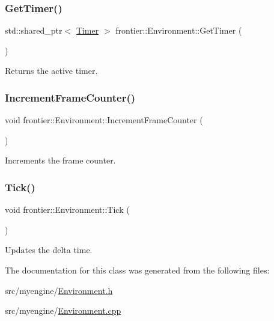 \subsubsection{\texorpdfstring{Get\+Timer()}{GetTimer()}}
{\footnotesize\ttfamily std\+::shared\+\_\+ptr$<$ \hyperlink{classfrontier_1_1_timer}{Timer} $>$ frontier\+::\+Environment\+::\+Get\+Timer (\begin{DoxyParamCaption}{ }\end{DoxyParamCaption})}



Returns the active timer. 

\mbox{\label{classfrontier_1_1_environment_a8cc8f5708b26f9366e620d13bb031e42}} 
\subsubsection{\texorpdfstring{Increment\+Frame\+Counter()}{IncrementFrameCounter()}}
{\footnotesize\ttfamily void frontier\+::\+Environment\+::\+Increment\+Frame\+Counter (\begin{DoxyParamCaption}{ }\end{DoxyParamCaption})}



Increments the frame counter. 

\mbox{\label{classfrontier_1_1_environment_a56c69f8866517b1dd93976690c869710}} 
\subsubsection{\texorpdfstring{Tick()}{Tick()}}
{\footnotesize\ttfamily void frontier\+::\+Environment\+::\+Tick (\begin{DoxyParamCaption}{ }\end{DoxyParamCaption})}



Updates the delta time. 



The documentation for this class was generated from the following files\+:\begin{DoxyCompactItemize}
\item 
src/myengine/\hyperlink{_environment_8h}{Environment.\+h}\item 
src/myengine/\hyperlink{_environment_8cpp}{Environment.\+cpp}\end{DoxyCompactItemize}
